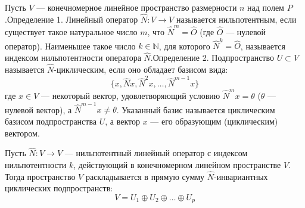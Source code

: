 \documentclass[14pt]{extreport}
\begin{document}
    \begin{defbox}
        Пусть $V$ — конечномерное линейное пространство размерности $n$ над полем $P$.Определение 1. Линейный оператор $\hat{N}: V \to V$ называется нильпотентным, если существует такое натуральное число $m$, что $\hat{N}^m = \hat{O}$ (где $\hat{O}$ — нулевой оператор). Наименьшее такое число $k \in \mathbb{N}$, для которого $\hat{N}^k = \hat{O}$, называется индексом нильпотентности оператора $\hat{N}$.Определение 2. Подпространство $U \subset V$ называется $\hat{N}$-циклическим, если оно обладает базисом вида:$$\{x, \hat{N}x, \hat{N}^2x, \dots, \hat{N}^{m-1}x\}$$где $x \in V$ — некоторый вектор, удовлетворяющий условию $\hat{N}^m x = \theta$ ($\theta$ — нулевой вектор), а $\hat{N}^{m-1} x \neq \theta$. Указанный базис называется циклическим базисом подпространства $U$, а вектор $x$ — его образующим (циклическим) вектором.
    \end{defbox}

    \begin{thbox}
        Пусть $\hat{N}: V \to V$ — нильпотентный линейный оператор с индексом нильпотентности $k$, действующий в конечномерном линейном пространстве $V$. Тогда пространство $V$ раскладывается в прямую сумму $\hat{N}$-инвариантных циклических подпространств:$$V = U_1 \oplus U_2 \oplus \dots \oplus U_p$$
    \end{thbox}
\end{document}
